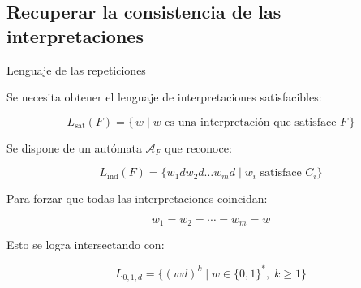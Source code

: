 \documentclass{beamer}
\newcommand{\aut}[1]{\mathcal{A}_{#1}}
\newcommand{\satlang}{L_{\mathrm{sat}}}
\newcommand{\indlang}{L_{\mathrm{ind}}}
\newcommand{\repeatlang}{L_{0,1,d}}
\begin{document}
\subsection{Recuperar la consistencia de las interpretaciones}

\begin{frame}
    \tableofcontents
\end{frame}

\begin{frame}{Lenguaje de las repeticiones}

    \pause

    Se necesita obtener el lenguaje de interpretaciones satisfacibles:

    \[
        \satlang(F) =
        \{\, w \mid w \text{ es una interpretación que satisface } F \,\}
    \]

    \vspace{0.4cm}

    \pause

    Se dispone de un autómata $\aut{F}$ que reconoce:

    \[
        \indlang(F) = \{w_1 d w_2 d \dots w_m d \mid w_i \text{ satisface } C_i\}
    \]

    \vspace{0.4cm}

    \pause

    Para forzar que todas las interpretaciones coincidan:

    \[
        w_1 = w_2 = \cdots = w_m = w
    \]

    \vspace{0.4cm}

    \pause

    Esto se logra intersectando con:

    \[
        \repeatlang = \{(wd)^k \mid w \in \{0,1\}^*,\; k \geq 1 \}
    \]

\end{frame}
\end{document}
